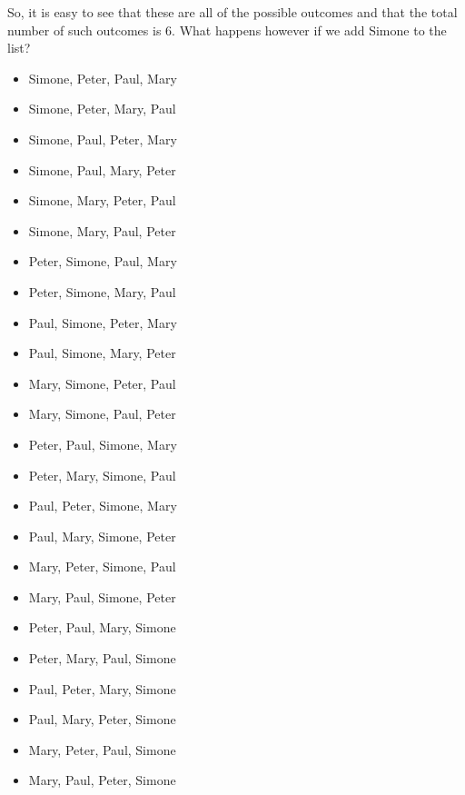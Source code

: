 \documentclass[10pt,]{book}
\theoremstyle{plain}
\theoremstyle{definition}
\theoremstyle{definition}
\numberwithin{equation}{section}
\begin{document}
So, it is easy to see that these are all of the possible outcomes and that the total number of such outcomes is 6. What happens however if we add Simone to the list?
\leavevmode%
\begin{itemize}[label=\textbullet]
\item{}Simone, Peter, Paul, Mary%
\item{}Simone, Peter, Mary, Paul%
\item{}Simone, Paul, Peter, Mary%
\item{}Simone, Paul, Mary, Peter%
\item{}Simone, Mary, Peter, Paul%
\item{}Simone, Mary, Paul, Peter%
\item{}Peter, Simone, Paul, Mary%
\item{}Peter, Simone, Mary, Paul%
\item{}Paul, Simone, Peter, Mary%
\item{}Paul, Simone, Mary, Peter%
\item{}Mary, Simone, Peter, Paul%
\item{}Mary, Simone, Paul, Peter%
\item{}Peter, Paul, Simone, Mary%
\item{}Peter, Mary, Simone, Paul%
\item{}Paul, Peter, Simone, Mary%
\item{}Paul, Mary, Simone, Peter%
\item{}Mary, Peter, Simone, Paul%
\item{}Mary, Paul, Simone, Peter%
\item{}Peter, Paul, Mary, Simone%
\item{}Peter, Mary, Paul, Simone%
\item{}Paul, Peter, Mary, Simone%
\item{}Paul, Mary, Peter, Simone%
\item{}Mary, Peter, Paul, Simone%
\item{}Mary, Paul, Peter, Simone%
\end{itemize}
\end{document}
